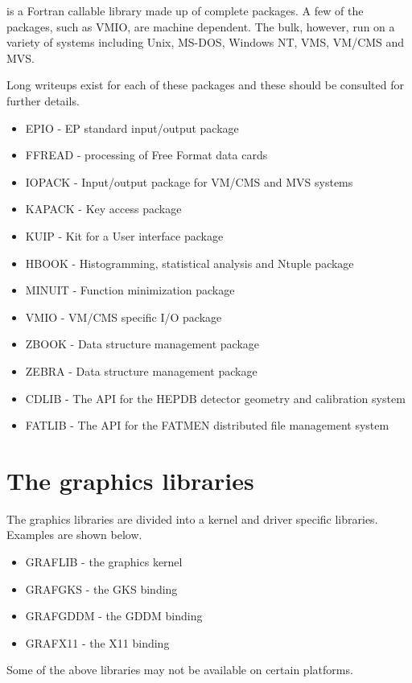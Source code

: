 \PACKLIB{} is a Fortran callable library made up of complete
packages. A few of the packages, such as VMIO, are
machine dependent. The bulk, however, run on a variety
of systems including Unix, MS-DOS, Windows NT, VMS, VM/CMS
and MVS.

Long writeups exist for each of these packages and these
should be consulted for further details.


\begin{itemize}
\item
EPIO - EP standard input/output package
\item
FFREAD - processing of Free Format data cards
\item
IOPACK - Input/output package for VM/CMS and MVS systems
\item
KAPACK - Key access package
\item
KUIP - Kit for a User interface package
\item
HBOOK - Histogramming, statistical analysis and Ntuple package
\item
MINUIT - Function minimization package
\item
VMIO - VM/CMS specific I/O package
\item
ZBOOK - Data structure management package
\item
ZEBRA - Data structure management package
\item
CDLIB - The API for the HEPDB detector geometry and calibration system
\item
FATLIB - The API for the FATMEN distributed file management system
\end{itemize}


\section{The graphics libraries}

The graphics libraries are divided into a kernel and
driver specific libraries. Examples are shown below.

\begin{itemize}
\item
GRAFLIB - the graphics kernel
\item
GRAFGKS - the GKS binding
\item
GRAFGDDM - the GDDM binding
\item
GRAFX11 - the X11 binding
\end{itemize}

Some of the above libraries may not be available
on certain platforms.

